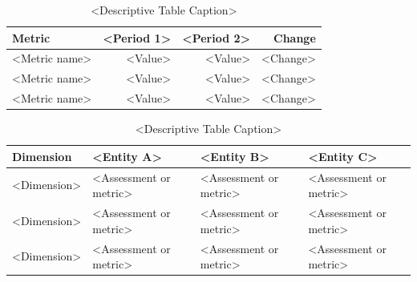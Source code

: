 \begin{table}[H]
\centering
\caption{<Descriptive Table Caption>}
\label{tab:<short-label>}
\small
\begin{tabular}{lrrr}
\toprule
\textbf{Metric} & \textbf{<Period 1>} & \textbf{<Period 2>} & \textbf{Change} \\
\midrule
<Metric name> & <Value> & <Value> & <Change> \\
<Metric name> & <Value> & <Value> & <Change> \\
<Metric name> & <Value> & <Value> & <Change> \\
\bottomrule
\end{tabular}
\end{table}

\begin{table}[H]
\centering
\caption{<Descriptive Table Caption>}
\label{tab:<short-label>}
\small
\begin{tabularx}{\textwidth}{l >{\raggedright\arraybackslash}X
                >{\raggedright\arraybackslash}X
                >{\raggedright\arraybackslash}X}
\toprule
\textbf{Dimension} & \textbf{<Entity A>} & \textbf{<Entity B>} & \textbf{<Entity C>} \\
\midrule
<Dimension> & <Assessment or metric> & <Assessment or metric> & <Assessment or metric> \\
<Dimension> & <Assessment or metric> & <Assessment or metric> & <Assessment or metric> \\
<Dimension> & <Assessment or metric> & <Assessment or metric> & <Assessment or metric> \\
\bottomrule
\end{tabularx}
\end{table}


